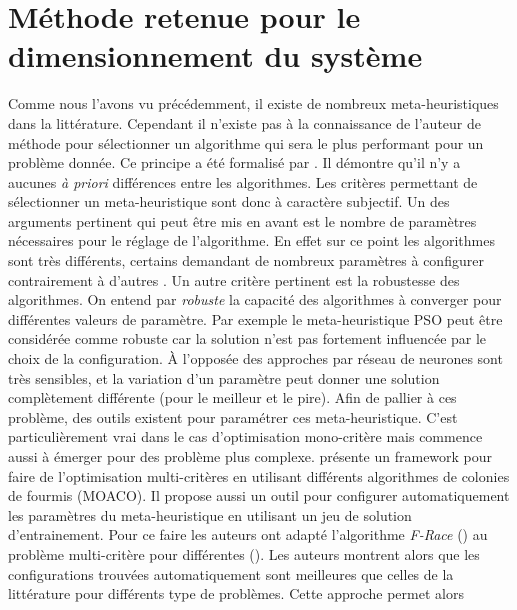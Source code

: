 \section{Méthode retenue pour le dimensionnement du système} %
\label{sec:methode_retenue_pour_le_dimensionnement_du_systeme}
Comme nous l’avons vu précédemment, il existe de nombreux meta-heuristiques dans
la littérature. Cependant il n’existe pas à la connaissance de l’auteur de méthode
pour sélectionner un algorithme qui sera le plus performant pour un problème donnée.
Ce principe a été formalisé par \cite{Wolpert_1997067} . Il démontre qu’il
n’y a aucunes \emph{à priori} différences entre les algorithmes. Les critères
permettant de sélectionner un meta-heuristique sont donc à caractère subjectif.
Un des arguments pertinent qui peut être mis en avant est le nombre de paramètres
nécessaires pour le réglage de l’algorithme. En effet sur ce point les algorithmes
sont très différents, certains demandant de nombreux paramètres à configurer
 contrairement
à d’autres . Un autre critère pertinent
est la robustesse des algorithmes. On entend par \emph{robuste} la capacité des algorithmes
à converger pour différentes valeurs de paramètre. Par exemple le meta-heuristique PSO
peut être considérée comme robuste  car la solution n’est
pas fortement influencée par le choix de la configuration.
À l’opposée des approches par réseau de neurones  sont
très sensibles, et la variation d’un paramètre peut donner une solution complètement
différente (pour le meilleur et le pire).
Afin de pallier à ces problème, des outils existent pour paramétrer ces meta-heuristique.
C’est particulièrement vrai dans le cas d’optimisation mono-critère mais commence
aussi à émerger pour des problème plus complexe. \cite{LopezIbanez_2012861}
présente un framework pour faire de l’optimisation multi-critères en utilisant
différents algorithmes de colonies de fourmis (MOACO). Il propose aussi un outil
pour configurer automatiquement les paramètres du meta-heuristique en utilisant un jeu de solution
d’entrainement. Pour ce faire les auteurs ont adapté l’algorithme \emph{F-Race} (\cite{LopezIbanez_2011000})
au problème multi-critère pour différentes (\cite{Birattari2010311, Zitzler2003117}). Les auteurs montrent
alors que les configurations trouvées automatiquement sont meilleures que celles
de la littérature pour différents type de problèmes. Cette approche permet alors
